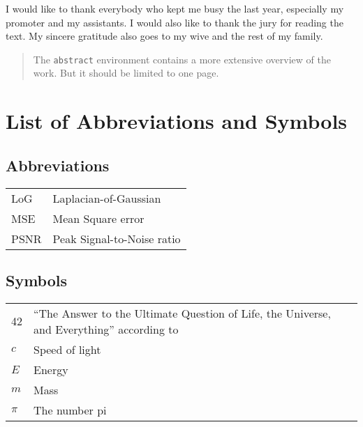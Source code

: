\documentclass[master=eelt,masteroption=ec]{kulemt}
\begin{document}
\begin{preface}
    I would like to thank everybody who kept me busy the last year,
    especially my promoter and my assistants. I would also like to thank the
    jury for reading the text. My sincere gratitude also goes to my wive and
    the rest of my family.
\end{preface}

\tableofcontents*

\begin{abstract}
    The \texttt{abstract} environment contains a more extensive overview of
    the work. But it should be limited to one page.
    \lipsum[1]
\end{abstract}

\listoffiguresandtables
\chapter{List of Abbreviations and Symbols}
\section*{Abbreviations}
\begin{flushleft}
    \renewcommand{\arraystretch}{1.1}
    \begin{tabularx}{\textwidth}{@{}p{12mm}X@{}}
        LoG  & Laplacian-of-Gaussian      \\
        MSE  & Mean Square error          \\
        PSNR & Peak Signal-to-Noise ratio \\
    \end{tabularx}
\end{flushleft}
\section*{Symbols}
\begin{flushleft}
    \renewcommand{\arraystretch}{1.1}
    \begin{tabularx}{\textwidth}{@{}p{12mm}X@{}}
        42    & ``The Answer to the Ultimate Question of Life, the Universe,
        and Everything'' according to \cite{h2g2}                            \\
        $c$   & Speed of light                                               \\
        $E$   & Energy                                                       \\
        $m$   & Mass                                                         \\
        $\pi$ & The number pi                                                \\
    \end{tabularx}
\end{flushleft}
\end{document}
